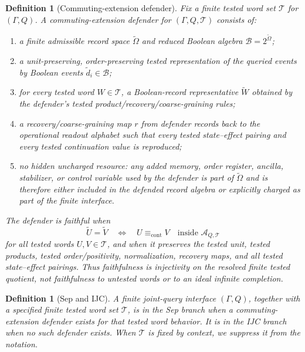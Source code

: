 \documentclass[11pt]{article}
\newtheorem{definition}[theorem]{Definition}
\newcommand{\AQtest}{\mathcal A_{Q,\mathcal T}}
\begin{document}
\begin{definition}[Commuting-extension defender]\label{def:commuting-extension-defender}
Fix a finite tested word set $\mathcal T$ for $(\Gamma,Q)$.  A \emph{commuting-extension defender} for $(\Gamma,Q,\mathcal T)$ consists of:
\begin{enumerate}[label=(\roman*),leftmargin=2em]
\item a finite admissible record space $\widetilde\Omega$ and reduced Boolean algebra $\mathcal B=2^{\widetilde\Omega}$;
\item a unit-preserving, order-preserving tested representation of the queried events by Boolean events $\widetilde d_i\in\mathcal B$;
\item for every tested word $W\in\mathcal T$, a Boolean-record representative $\widetilde W$ obtained by the defender's tested product/recovery/coarse-graining rules;
\item a recovery/coarse-graining map $r$ from defender records back to the operational readout alphabet such that every tested state--effect pairing and every tested continuation value is reproduced;
\item no hidden uncharged resource: any added memory, order register, ancilla, stabilizer, or control variable used by the defender is part of $\widetilde\Omega$ and is therefore either included in the defended record algebra or explicitly charged as part of the finite interface.
\end{enumerate}
The defender is \emph{faithful} when
\[
  \widetilde U=\widetilde V
  \quad\Longleftrightarrow\quad
  U\equiv_{\mathrm{cont}}V
  \quad\text{inside }\AQtest
\]
for all tested words $U,V\in\mathcal T$, and when it preserves the tested unit, tested products, tested order/positivity, normalization, recovery maps, and all tested state--effect pairings.  Thus faithfulness is injectivity on the resolved finite tested quotient, not faithfulness to untested words or to an ideal infinite completion.
\end{definition}

\begin{definition}[Sep and IJC]\label{def:sep-ijc-tested}
A finite joint-query interface $(\Gamma,Q)$, together with a specified finite tested word set $\mathcal T$, is in the Sep branch when a commuting-extension defender exists for that tested word behavior.  It is in the IJC branch when no such defender exists.  When $\mathcal T$ is fixed by context, we suppress it from the notation.
\end{definition}
\end{document}
